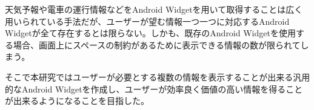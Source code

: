 
\begin{jabstract}
天気予報や電車の運行情報などをAndroid Widgetを用いて取得することは広く用いられている手法だが、ユーザーが望む情報一つ一つに対応するAndroid Widgetが全て存在するとは限らない。しかも、既存のAndroid Widgetを使用する場合、画面上にスペースの制約があるために表示できる情報の数が限られてしまう。

そこで本研究ではユーザーが必要とする複数の情報を表示することが出来る汎用的なAndroid Widgetを作成し、ユーザーが効率良く価値の高い情報を得ることが出来るようになることを目指した。

\end{jabstract}
